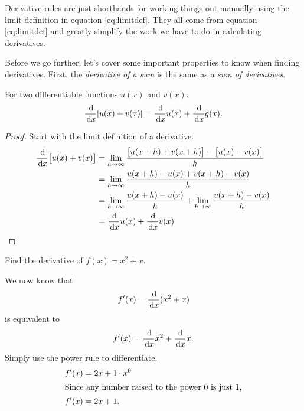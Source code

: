 
%

Derivative rules are just shorthands for working things out manually using the limit definition in equation \eqref{eq:limitdef}.
They all come from equation \eqref{eq:limitdef} and greatly simplify the work we have to do in calculating derivatives.

Before we go further, let's cover some important properties to know when finding derivatives.
First, the \emph{derivative of a sum} is the same as a \emph{sum of derivatives}.
\begin{theorem}
  For two differentiable functions $u(x)$ and $v(x)$,
  \[ \frac{\,\mathrm{d}}{\,\mathrm{d} x} [u(x)+v(x)] = \frac{\,\mathrm{d}}{\,\mathrm{d} x} u(x) + \frac{\,\mathrm{d}}{\,\mathrm{d} x} g(x). \]
  \label{th:sumrulederiv}
  \begin{proof}
    Start with the limit definition of a derivative.
    \begin{align*}
      \frac{\,\mathrm{d}}{\,\mathrm{d} x} \big[u(x)+v(x)\big] &= \lim_{h\to\infty} \frac{\big[u(x+h)+v(x+h)\big]-\big[u(x)-v(x)\big]}{h} \\
      &= \lim_{h\to\infty} \frac{u(x+h)-u(x)+v(x+h)-v(x)}{h} \\
      &= \lim_{h\to\infty} \frac{u(x+h)-u(x)}{h} + \lim_{h\to\infty} \frac{v(x+h)-v(x)}{h}\\
      &= \frac{\,\mathrm{d}}{\,\mathrm{d} x} u(x) + \frac{\,\mathrm{d}}{\,\mathrm{d} x} v(x) \qedhere
    \end{align*}
  \end{proof}
\end{theorem}
\begin{ex}
  Find the derivative of $f(x)=x^2+x$.
  \begin{sol}
    We now know that
    \[ f'(x) = \frac{\,\mathrm{d}}{\,\mathrm{d} x} (x^2+x)\]
    is equivalent to
    \[ f'(x) =\frac{\,\mathrm{d}}{\,\mathrm{d} x} x^2 + \frac{\,\mathrm{d}}{\,\mathrm{d} x} x.\]
    Simply use the power rule to differentiate.
    \begin{align*}
      f'(x) &= 2x+1\cdot x^0 \\
      \intertext{Since any number raised to the power $0$ is just $1$,}
      f'(x)&= 2x+1.
    \end{align*}
  \end{sol}
\end{ex}

